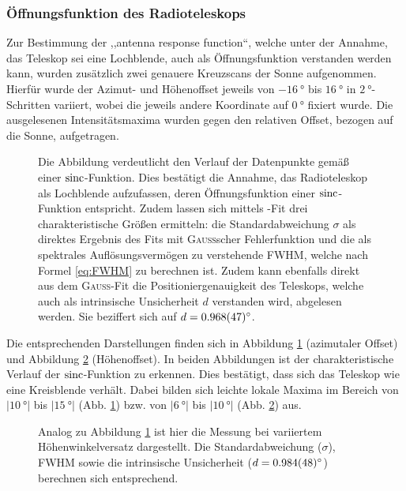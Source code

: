     \subsubsection{Öffnungsfunktion des Radioteleskops}
    Zur Bestimmung der ,,antenna response function``,
    welche unter der Annahme, das Teleskop sei eine Lochblende, auch als Öffnungsfunktion verstanden werden kann,
    wurden zusätzlich zwei genauere Kreuzscans der Sonne aufgenommen.
    Hierfür wurde der Azimut- und Höhenoffset jeweils von $\SI{-16}{\degree}$ bis $\SI{16}{\degree}$ in $\SI{2}{\degree}$-Schritten variiert, wobei die jeweils andere Koordinate auf $\SI{0}{\degree}$ fixiert wurde.
    Die ausgelesenen Intensitätsmaxima wurden gegen den relativen Offset, bezogen auf die Sonne, aufgetragen.
    \begin{figure}[H]
        \centering
        
        \caption[Kreuz-Scan der Sonne, Azimutwinkelversatz]{Die Abbildung verdeutlicht den Verlauf der Datenpunkte gemäß einer $\operatorname{sinc}$-Funktion. Dies bestätigt die Annahme, das Radioteleskop als Lochblende aufzufassen, deren Öffnungsfunktion einer $\operatorname{sinc}$-Funktion entspricht. Zudem lassen sich mittels -Fit drei charakteristische Größen ermitteln: die Standardabweichung $\sigma$ als direktes Ergebnis des Fits mit \textsc{Gauß}scher Fehlerfunktion und die als spektrales Auflösungsvermögen zu verstehende FWHM, welche nach Formel \eqref{eq:FWHM} zu berechnen ist. Zudem kann ebenfalls direkt aus dem \textsc{Gauß}-Fit die Positioniergenauigkeit des Teleskops, welche auch als intrinsische Unsicherheit $d$ verstanden wird, abgelesen werden. Sie beziffert sich auf $d = \SI{0.968 \pm 0.047}{\degree}$.}
        \label{fig:Sonnenkreuz_Az}
    \end{figure}
    Die entsprechenden Darstellungen finden sich in Abbildung \ref{fig:Sonnenkreuz_Az} (azimutaler Offset) und Abbildung \ref{fig:Sonnenkreuz_Alt} (Höhenoffset).
    In beiden Abbildungen ist der charakteristische Verlauf der $\operatorname{sinc}$-Funktion zu erkennen.
    Dies bestätigt, dass sich das Teleskop wie eine Kreisblende verhält.
    Dabei bilden sich leichte lokale Maxima im Bereich von $\vert\SI{10}{\degree}\vert$ bis $\vert\SI{15}{\degree}\vert$ (Abb. \ref{fig:Sonnenkreuz_Az}) bzw. von $\vert\SI{6}{\degree}\vert$ bis $\vert\SI{10}{\degree}\vert$ (Abb. \ref{fig:Sonnenkreuz_Alt}) aus.
    \begin{figure}[H]
        \centering
        
        \caption[Kreuz-Scan der Sonne, Höhenwinkelversatz]{Analog zu Abbildung \ref{fig:Sonnenkreuz_Az} ist hier die Messung bei variiertem Höhenwinkelversatz dargestellt. Die Standardabweichung ($\sigma$), FWHM sowie die intrinsische Unsicherheit ($d = \SI{0.984 \pm 0.048}{\degree}$) berechnen sich entsprechend.}
        \label{fig:Sonnenkreuz_Alt}
    \end{figure}
